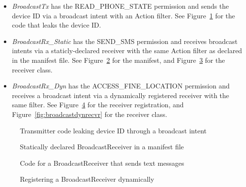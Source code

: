 \begin{itemize}
\item{} \emph{BroadcastTx} has the READ\_PHONE\_STATE permission and sends the device ID via a broadcast intent with an Action filter. See Figure~\ref{fig:broadcastleak} for the code that leaks the device ID.

\item{} \emph{BroadcastRx\_Static} has the SEND\_SMS permission and receives broadcast intents via a staticly-declared receiver with the same Action filter as declared in the manifest file.  See Figure~\ref{fig:broadcastmanifest} for the manifest, and Figure~\ref{fig:broadcaststaticrecvr} for the receiver class.

\item{} \emph{BroadcastRx\_Dyn} has the ACCESS\_FINE\_LOCATION permission and receives a broadcast intent via a dynamically registered receiver with the same filter.  See Figure~\ref{fig:broadcastregister} for the receiver registration, and Figure~\ref{fig:broadcastdynrecvr} for the receiver class. 
\end{itemize} 

\begin{figure}[!h]
\begin{framed}

\caption{Transmitter code leaking device ID through a broadcast intent}
\label{fig:broadcastleak}
\end{framed}
\end{figure}

\begin{figure}[!h]
\begin{framed}

\caption{Statically declared BroadcastReceiver in a manifest file}
\label{fig:broadcastmanifest}
\end{framed}
\end{figure}

\begin{figure}[!h]
\begin{framed}

\caption{Code for a BroadcastReceiver that sends text messages}
\label{fig:broadcaststaticrecvr}
\end{framed}
\end{figure}

\begin{figure}[!h]
\begin{framed}

\caption{Registering a BroadcastReceiver dynamically}
\label{fig:broadcastregister}
\end{framed}
\end{figure}


